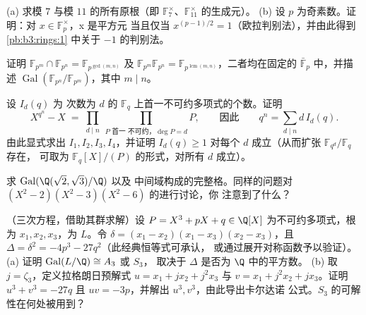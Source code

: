 \begin{exercise}[$\star\star$]\label{exo:b3:galois:4}
(a) 求模 $7$ 与模 $11$ 的所有原根（即
$\mathbb F_7^\times$、$\mathbb F_{11}^\times$ 的生成元）。
(b) 设 $p$ 为奇素数。证明：对 $x \in \mathbb F_p^\times$，x 是平方元
当且仅当 $x^{(p-1)/2} = 1$（欧拉判别法），并由此得到
\cref{pb:b3:rings:1} 中关于 $-1$ 的判别法。
\end{exercise}

\begin{exercise}[$\star\star$]\label{exo:b3:galois:5}
证明 $\mathbb F_{p^m} \cap \mathbb F_{p^n} = \mathbb
F_{p^{\gcd(m,n)}}$ 及 $\mathbb F_{p^m}\mathbb F_{p^n} = \mathbb
F_{p^{\operatorname{lcm}(m,n)}}$，二者均在固定的 $\bar{\mathbb F}_p$ 中，并描述
$\operatorname{Gal}(\mathbb F_{p^n}/\mathbb F_{p^m})$，其中 $m
\mid n$。
\end{exercise}

\begin{exercise}[$\star\star$]\label{exo:b3:galois:6}
设 $I_d(q)$ 为
次数为 $d$ 的 $\mathbb F_q$ 上首一不可约多项式的个数。证明
\[
X^{q^n} - X \;=\; \prod_{d \mid n}\ \prod_{P \text{ 首一
不可约，} \deg P = d} P ,
\qquad\text{因此}\qquad
q^n = \sum_{d \mid n} d\, I_d(q).
\]
由此显式求出 $I_1, I_2, I_3, I_4$，并证明 $I_d(q) \geq 1$
对每个 $d$ 成立（从而扩张 $\mathbb F_{q^d}/\mathbb F_q$ 存在，
可取为 $\mathbb F_q[X]/(P)$ 的形式，对所有 $d$ 成立）。
\end{exercise}

\begin{exercise}[$\star\star$]\label{exo:b3:galois:7}
求 $\operatorname{Gal}(\Q(\sqrt2,\sqrt3)/\Q)$ 以及
中间域构成的完整格。同样的问题对
$(X^2-2)(X^2-3)(X^2-6)$ 的进行讨论，你
注意到了什么？
\end{exercise}

\begin{exercise}[$\star\star$]\label{exo:b3:galois:8}
（三次方程，借助其群求解）设 $P = X^3 + pX + q \in
\Q[X]$ 为不可约多项式，根为 $x_1, x_2, x_3$，为
$L$。令 $\delta = (x_1 - x_2)(x_1 - x_3)(x_2 - x_3)$，且
$\Delta = \delta^2 = -4p^3 - 27q^2$（此经典恒等式可承认，
或通过展开对称函数予以验证）。
(a) 证明 $\operatorname{Gal}(L/\Q) \cong A_3$ 或 $S_3$，
取决于 $\Delta$ 是否为 $\Q$ 中的平方数。
(b) 取 $j = \zeta_3$，定义拉格朗日预解式 $u = x_1
+ jx_2 + j^2x_3$ 与 $v = x_1 + j^2x_2 + jx_3$。证明 $u^3 + v^3
= -27q$ 且 $uv = -3p$，并解出 $u^3, v^3$，由此导出卡尔达诺
公式。$S_3$ 的可解性在何处被用到？
\end{exercise}

